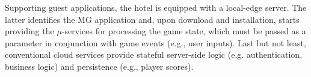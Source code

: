 Supporting guest applications, the hotel is equipped with a local-edge server. The latter identifies the MG application and, upon download and installation, starts providing the $\mu$-services for processing the game state, which must be passed as a parameter in conjunction with game events (e.g., user inputs). Last but not least, conventional cloud services provide stateful server-side logic (e.g. authentication, business logic) and persistence (e.g., player scores).  








